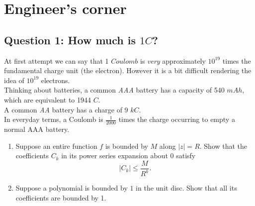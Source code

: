 \documentclass[12pt]{article}
\newcommand{\I}{\textit}
\newenvironment{problem}[2][Problem]{\begin{trivlist}
\item[\hskip \labelsep {\bfseries #1}\hskip \labelsep {\bfseries #2.}]}{\end{trivlist}}
\begin{document}
\newpage
\section{Engineer's corner}
\subsection*{Question 1: How much is $1 C$?} 
At first attempt we can say that 1 $Coulomb$ is \I{very} approximately $10^{19}$ times the fundamental charge unit (the electron). However it is a bit difficult rendering the idea of $10^{19}$ electrons. \\
Thinking about batteries, a common \I{AAA} battery has a capacity of 540 $mAh$, which are equivalent to 1944 $C$. \\
A common \I{AA} battery has a charge of 9 $kC$. \\
In everyday terms, a Coulomb is $\frac{1}{2000}$ times the charge occurring to empty a normal AAA battery.








\newpage
\begin{problem}{6}
\begin{enumerate}[label=\alph*)]
    \item Suppose an entire function $f$ is bounded by $M$ along $|z|=R$. Show that the coefficients $C_k$ in its power series expansion about $0$ satisfy
    \[
    |C_k|\leq\frac{M}{R^k}.
    \]
    \item Suppose a polynomial is bounded by $1$ in the unit disc. Show that all its coefficients are bounded by 1.
\end{enumerate}
\end{problem}
\end{document}
